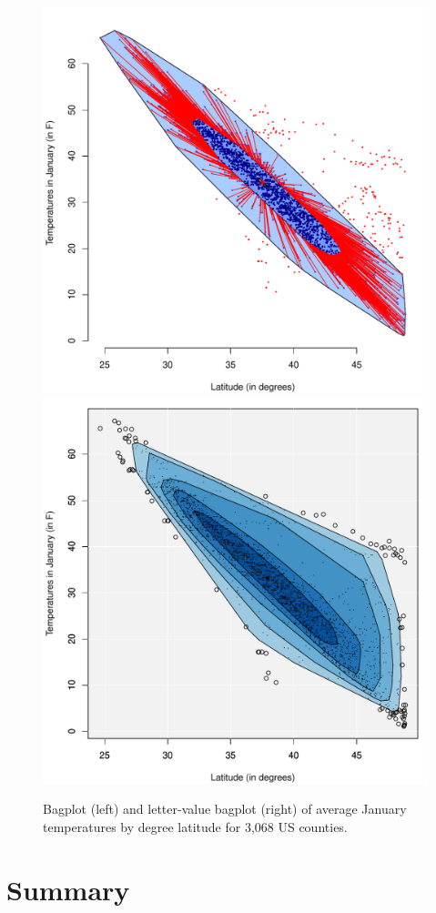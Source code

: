\documentclass[oneside]{article}
\begin{document}
\begin{figure}[hbtp]
  \centering
  \includegraphics[width=0.5\linewidth]{images/counties-bag}%
  \includegraphics[width=0.5\linewidth]{images/counties-lvbag}

  \caption{Bagplot (left) and letter-value bagplot (right) of average January
  temperatures by degree latitude for 3,068 US counties. }

  \label{counties-bag} 

\end{figure}

\section{Summary}
\label{sec:summary}
\end{document}
